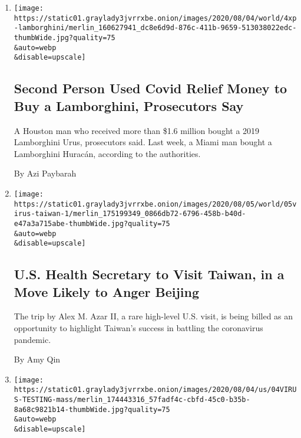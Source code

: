 \begin{enumerate}
\def\labelenumi{\arabic{enumi}.}
\item
  \href{/2020/08/04/us/lamborghini-coronavirus-stimulus.html}{}

  \texttt{[image: https://static01.graylady3jvrrxbe.onion/images/2020/08/04/world/4xp-lamborghini/merlin\_160627941\_dc8e6d9d-876c-411b-9659-513038022edc-thumbWide.jpg?quality=75\\\&auto=webp\\\&disable=upscale]}

  \hypertarget{second-person-used-covid-relief-money-to-buy-a-lamborghini-prosecutors-say}{%
  \subsection{Second Person Used Covid Relief Money to Buy a
  Lamborghini, Prosecutors
  Say}\label{second-person-used-covid-relief-money-to-buy-a-lamborghini-prosecutors-say}}

  A Houston man who received more than \$1.6 million bought a 2019
  Lamborghini Urus, prosecutors said. Last week, a Miami man bought a
  Lamborghini Huracán, according to the authorities.

  By Azi Paybarah
\item
  \href{/2020/08/04/world/asia/taiwan-azar-beijing-coronavirus.html}{}

  \texttt{[image: https://static01.graylady3jvrrxbe.onion/images/2020/08/05/world/05virus-taiwan-1/merlin\_175199349\_0866db72-6796-458b-b40d-e47a3a715abe-thumbWide.jpg?quality=75\\\&auto=webp\\\&disable=upscale]}

  \hypertarget{us-health-secretary-to-visit-taiwan-in-a-move-likely-to-anger-beijing}{%
  \subsection{U.S. Health Secretary to Visit Taiwan, in a Move Likely to
  Anger
  Beijing}\label{us-health-secretary-to-visit-taiwan-in-a-move-likely-to-anger-beijing}}

  The trip by Alex M. Azar II, a rare high-level U.S. visit, is being
  billed as an opportunity to highlight Taiwan's success in battling the
  coronavirus pandemic.

  By Amy Qin
\item
  \href{/2020/08/04/us/virus-testing-delays.html}{}

  \texttt{[image: https://static01.graylady3jvrrxbe.onion/images/2020/08/04/us/04VIRUS-TESTING-mass/merlin\_174443316\_57fadf4c-cbfd-45c0-b35b-8a68c9821b14-thumbWide.jpg?quality=75\\\&auto=webp\\\&disable=upscale]}


\end{enumerate}
